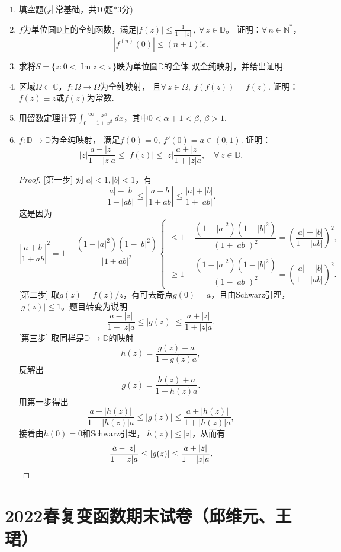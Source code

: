 \begin{enumerate}
\item 填空题(非常基础，共10题*3分)

\item $f$为单位圆$\mathbb{D}$上的全纯函数，满足$\displaystyle|f(z)|
\leq\frac{1}{1-|z|}\ ,\ \forall\, z\in\mathbb{D}$。
证明：$\forall\, n\in\mathbb{N}^{*}$，
\[|f^{(n)}(0)|\leq (n+1)!e.\]

\item 求将$S=\{z:0<\operatorname{Im}z<\pi\}$映为单位圆$\mathbb{D}$的全体
双全纯映射，并给出证明.

\item 区域$\Omega\subset\mathbb{C}$，$f:\Omega\to\Omega$为全纯映射，
且$\forall\, z\in\Omega,\ f(f(z))=f(z)$.
证明：$f(z)\equiv z$或$f(z)$为常数.

\item 用留数定理计算$\displaystyle\int_{0}^{+\infty}
\frac{x^{\alpha}}{1+x^{\beta}}\,dx$，其中$0<\alpha+1<\beta,\ \beta>1$.

\item $f:\mathbb{D}\to\mathbb{D}$为全纯映射，
满足$f(0)=0,\ f'(0)=a\in(0,1)$. 证明：
\[|z|\frac{a-|z|}{1-|z|a}\leq |f(z)|
\leq |z|\frac{a+|z|}{1+|z|a},\quad\forall\, z\in\mathbb{D}.\]
\begin{proof}{ }
    [第一步] 对$|a|<1,|b|<1$，有
    \[\frac{|a|-|b|}{1-|ab|}\leq\left|\frac{a+b}{1+ab}\right|\leq\frac{|a|+|b|}{1+|ab|}.\]
    这是因为
    \[\left|\frac{a+b}{1+ab}\right|^2=1-\frac{(1-|a|^2)(1-|b|^2)}{|1+ab|^2}
    \begin{cases}\leq1-\dfrac{(1-|a|^2)(1-|b|^2)}{(1+|ab|)^2}=\left(\dfrac{|a|+|b|}{1+|ab|}\right)^2,\\ \\
    \geq1-\dfrac{(1-|a|^2)(1-|b|^2)}{(1-|ab|)^2}=\left(\dfrac{|a|-|b|}{1-|ab|}\right)^2.\end{cases}\]
    [第二步] 取$g(z)=f(z)/z$，有可去奇点$g(0)=a$，且由Schwarz引理，$|g(z)|\leq1$。题目转变为说明
    \[\frac{a-|z|}{1-|z|a}\leq|g(z)|\leq\frac{a+|z|}{1+|z|a}.\]
    [第三步] 取同样是$\mathbb{D}\to\mathbb{D}$的映射
    \[h(z)=\frac{g(z)-a}{1-g(z)a},\]
    反解出\[g(z)=\frac{h(z)+a}{1+h(z)a}.\]
    用第一步得出\[\frac{a-|h(z)|}{1-|h(z)|a}\leq|g(z)|\leq\frac{a+|h(z)|}{1+|h(z)|a},\]
    接着由$h(0)=0$和Schwarz引理，$|h(z)|\leq|z|$，从而有
    \[\frac{a-|z|}{1-|z|a}\leq|g(z)|\leq\frac{a+|z|}{1+|z|a}.\qedhere\]
\end{proof}
\end{enumerate}

\section{2022春复变函数期末试卷（邱维元、王珺）}
